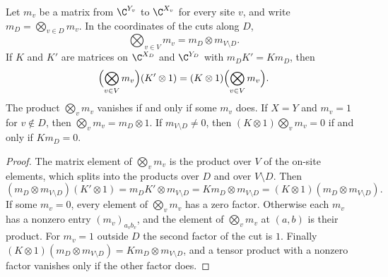 \begin{lemma}
    \label{lem:sites_product_intertwine}
    \leanok
    Let $m_v$ be a matrix from $\C^{Y_v}$ to $\C^{X_v}$ for every site $v$, and
    write $m_D=\bigotimes_{v\in D}m_v$. In the coordinates of the cuts along $D$,
    \[
        \bigotimes_{v\in V}m_v=m_D\otimes m_{V\setminus D}.
    \]
    If $K$ and $K'$ are matrices on $\C^{X_D}$ and $\C^{Y_D}$ with
    $m_DK'=Km_D$, then
    \[
        \Bigl(\bigotimes_{v\in V}m_v\Bigr)(K'\otimes1)
        =(K\otimes1)\Bigl(\bigotimes_{v\in V}m_v\Bigr).
    \]
    The product $\bigotimes_vm_v$ vanishes if and only if some $m_v$ does. If $X=Y$
    and $m_v=1$ for $v\notin D$, then $\bigotimes_vm_v=m_D\otimes1$. If $m_{V\setminus D}\neq0$, then
    $(K\otimes1)\bigotimes_vm_v=0$ if and only if $Km_D=0$.
\end{lemma}
\begin{proof}\leanok
    The matrix element of $\bigotimes_vm_v$ is the product over $V$ of the on-site
    elements, which splits into the products over $D$ and over $V\setminus D$. Then
    \[
        (m_D\otimes m_{V\setminus D})(K'\otimes1)=m_DK'\otimes m_{V\setminus D}
        =Km_D\otimes m_{V\setminus D}=(K\otimes1)(m_D\otimes m_{V\setminus D}).
    \]
    If some $m_v=0$, every element of $\bigotimes_vm_v$ has a zero factor. Otherwise each
    $m_v$ has a nonzero entry $(m_v)_{a_vb_v}$, and the element of $\bigotimes_vm_v$ at
    $(a,b)$ is their product. For $m_v=1$ outside $D$ the second
    factor of the cut is $1$. Finally
    $(K\otimes1)(m_D\otimes m_{V\setminus D})=Km_D\otimes m_{V\setminus D}$, and a
    tensor product with a nonzero factor vanishes only if the other factor does.
\end{proof}

